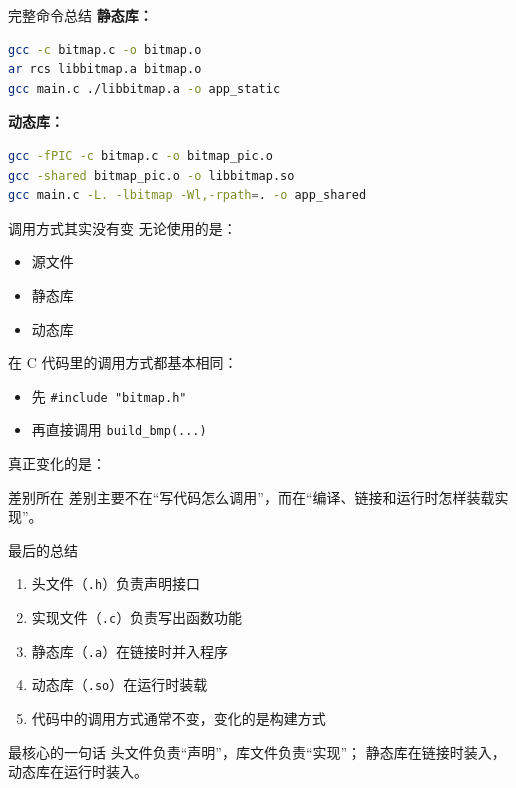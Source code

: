 \documentclass[aspectratio=169,11pt]{beamer}
\begin{document}
\begin{frame}[fragile]{完整命令总结}
\textbf{静态库：}
\begin{lstlisting}[language=bash]
gcc -c bitmap.c -o bitmap.o
ar rcs libbitmap.a bitmap.o
gcc main.c ./libbitmap.a -o app_static
\end{lstlisting}

\textbf{动态库：}
\begin{lstlisting}[language=bash]
gcc -fPIC -c bitmap.c -o bitmap_pic.o
gcc -shared bitmap_pic.o -o libbitmap.so
gcc main.c -L. -lbitmap -Wl,-rpath=. -o app_shared
\end{lstlisting}
\end{frame}


\begin{frame}[fragile]{调用方式其实没有变}
无论使用的是：
\begin{itemize}
  \item 源文件
  \item 静态库
  \item 动态库
\end{itemize}

在 C 代码里的调用方式都基本相同：
\begin{itemize}
  \item 先 \texttt{\#include "bitmap.h"}
  \item 再直接调用 \texttt{build\_bmp(...)}
\end{itemize}

真正变化的是：
\begin{block}{差别所在}
差别主要不在“写代码怎么调用”，而在“编译、链接和运行时怎样装载实现”。
\end{block}
\end{frame}

\begin{frame}{最后的总结}
\begin{enumerate}
  \item 头文件（\texttt{.h}）负责声明接口
  \item 实现文件（\texttt{.c}）负责写出函数功能
  \item 静态库（\texttt{.a}）在链接时并入程序
  \item 动态库（\texttt{.so}）在运行时装载
  \item 代码中的调用方式通常不变，变化的是构建方式
\end{enumerate}

\vspace{0.8em}
\begin{alertblock}{最核心的一句话}
头文件负责“声明”，库文件负责“实现”；
静态库在链接时装入，动态库在运行时装入。
\end{alertblock}
\end{frame}
\end{document}
